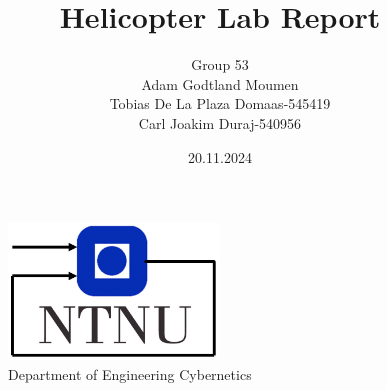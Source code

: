 \documentclass[11pt, a4paper, USenglish]{article} %
\begin{document}
\title{Helicopter Lab Report }
\author{Group 53\\Adam Godtland Moumen\\Tobias De La Plaza Domaas-545419\\Carl Joakim Duraj-540956}
\date{20.11.2024}
\begin{titlepage}
    \maketitle
    \begin{figure}
    \centering
    \includegraphics[width=0.5\textwidth]{figures/itk_ntnu}\\
    Department of Engineering Cybernetics
    \end{figure}
    \thispagestyle{empty}
\end{titlepage}

\newpage
    
\thispagestyle{empty} %

\newpage
\tableofcontents
\thispagestyle{empty} %

\newpage
\setcounter{page}{1}






\newpage
{}
\printbibliography{}
\label{sec:bibliography}
\end{document}
